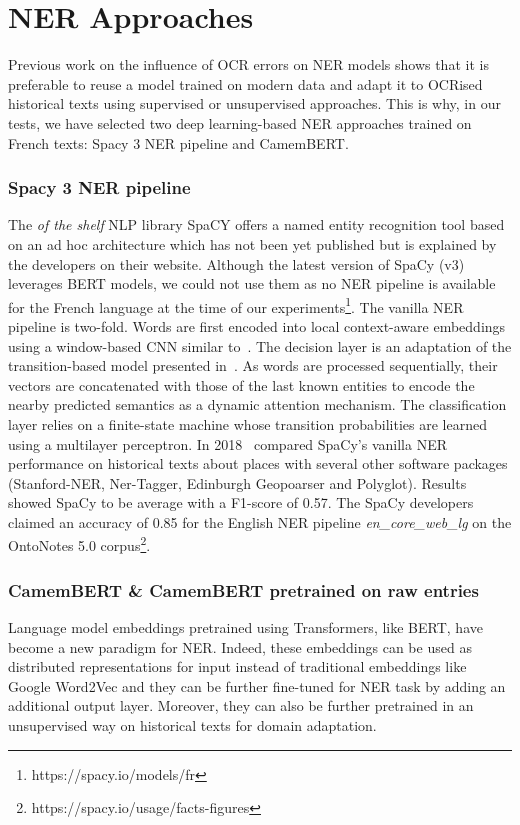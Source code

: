 \section{NER Approaches}

Previous work on the influence of OCR errors on NER models shows that it is preferable to reuse a model trained on modern data and adapt it to OCRised historical texts using supervised or unsupervised approaches. This is why, in our tests, we have selected two deep learning-based NER approaches trained on French texts: Spacy 3 NER pipeline and CamemBERT. 

\subsubsection{Spacy 3 NER pipeline}
The \textit{of the shelf} NLP library SpaCY offers a named entity recognition tool based on an ad hoc architecture which has not been yet published but is explained by the developers on their website. Although the latest version of SpaCy (v3) leverages BERT models, we could not use them as no NER pipeline is available for the French language at the time of our experiments\footnote{https://spacy.io/models/fr}.
The vanilla NER pipeline is two-fold. Words are first encoded into local context-aware embeddings using a window-based CNN similar to~\cite{collobert2011}.
The decision layer is an adaptation of the transition-based model presented in~\cite{lample2016}.
As words are processed sequentially, their vectors are concatenated with those of the last known entities to encode the nearby predicted semantics as a dynamic attention mechanism.
The classification layer relies on a finite-state machine whose transition probabilities are learned using a multilayer perceptron.
In 2018~\cite{won2018} compared SpaCy's vanilla NER performance on historical texts about places with several other software packages (Stanford-NER, Ner-Tagger, Edinburgh Geopoarser and Polyglot). Results showed SpaCy to be average with a F1-score of 0.57.
The SpaCy developers claimed an accuracy of 0.85 for the English NER pipeline \textit{en\_core\_web\_lg} on the OntoNotes 5.0 corpus\footnote{https://spacy.io/usage/facts-figures}.

\subsubsection{CamemBERT \& CamemBERT pretrained on raw entries}

Language model embeddings pretrained using Transformers, like BERT, have become a new paradigm for NER\cite{li2020}. Indeed, these embeddings can be used as distributed representations for input instead of traditional embeddings like Google Word2Vec and they can be further fine-tuned for NER task by adding an additional output layer. Moreover, they can also be further pretrained in an unsupervised way on historical texts for domain adaptation.


